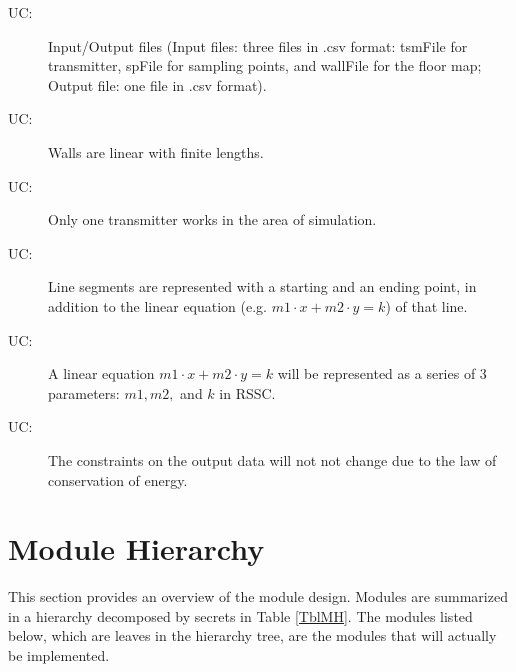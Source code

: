 \documentclass[12pt, titlepage]{article}
\newcounter{ucnum}
\newcommand{\uctheucnum}{UC\theucnum}
\begin{document}
\begin{description}
\item[ \uctheucnum \label{ucIO}:] Input/Output files
  (Input files: three files in .csv format: tsmFile for transmitter, spFile for sampling points, and wallFile for the floor map; Output file: one file in .csv format).
\item[ \uctheucnum \label{ucWallShape}:] Walls are linear with finite lengths.
\item[ \uctheucnum \label{ucSingleSource}:] Only one transmitter works in the area of simulation.
\item[ \uctheucnum \label{ucSegment}:] Line segments are represented with a starting and an ending point, in addition to the linear equation (e.g. $m1\cdot x+m2\cdot y = k$) of that line.
\item[ \uctheucnum \label{ucEquation}:] A linear equation $m1\cdot x+m2\cdot y = k$ will be represented as a series of 3 parameters: $m1, m2,$ and $k$ in RSSC. 
\item[ \uctheucnum \label{ucOutputConstr}:] The constraints on the output data will not not change due to the law of conservation of energy. 
\end{description}

\section{Module Hierarchy} \label{SecMH}

This section provides an overview of the module design. Modules are summarized
in a hierarchy decomposed by secrets in Table \ref{TblMH}. The modules listed
below, which are leaves in the hierarchy tree, are the modules that will
actually be implemented.
\end{document}

